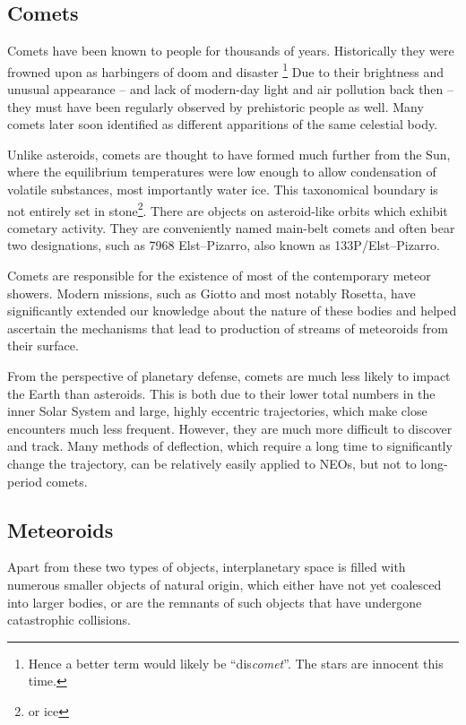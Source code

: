     \subsection{Comets} \label{iac}
        Comets have been known to people for thousands of years. Historically they were
        frowned upon as harbingers of doom and disaster%
        \footnote{Hence a better term would likely be ``dis\textit{comet}''. The stars are innocent this time.}
        Due to their brightness and unusual appearance -- and lack of modern-day light and air pollution
        back then -- they must have been regularly observed by prehistoric people as well.
        Many comets later soon identified as different apparitions of the same celestial body.

        Unlike asteroids, comets are thought to have formed much further from the Sun, where the equilibrium
        temperatures were low enough to allow condensation of volatile substances, most importantly water ice.
        This taxonomical boundary is not entirely set in stone\footnote{or ice}.
        There are objects on asteroid-like orbits which exhibit cometary activity.
        They are conveniently named main-belt comets and often bear two designations, such as 7968 Elst--Pizarro,
        also known as 133P/Elst--Pizarro.

        Comets are responsible for the existence of most of the contemporary meteor showers.
        Modern missions, such as Giotto and most notably Rosetta, have significantly extended our knowledge
        about the nature of these bodies and helped ascertain the mechanisms that lead to production
        of streams of meteoroids from their surface.

        From the perspective of planetary defense, comets are much less likely to impact the Earth
        than asteroids. This is both due to their lower total numbers in the inner Solar System
        and large, highly eccentric trajectories, which make close encounters much less frequent.
        However, they are much more difficult to discover and track.
        Many methods of deflection, which require a long time to significantly change the trajectory,
        can be relatively easily applied to NEOs, but not to long-period comets.

    \subsection{Meteoroids} \label{iam}
        Apart from these two types of objects, interplanetary space is filled with numerous smaller objects
        of natural origin, which either have not yet coalesced into larger bodies, or are the remnants
        of such objects that have undergone catastrophic collisions.

